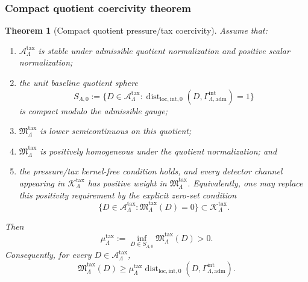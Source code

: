 \documentclass[11pt]{article}
\numberwithin{equation}{section}
\newtheorem{theorem}{Theorem}[section]
\theoremstyle{definition}
\theoremstyle{remark}
\newcommand{\loc}{\mathrm{loc}}
\newcommand{\intg}{\mathrm{int}}
\newcommand{\adm}{\mathrm{adm}}
\newcommand{\Dist}{\operatorname{dist}}
\newcommand{\Gammaadm}{\Gamma^{\intg}_{\Lambda,\adm}}
\begin{document}
\subsubsection{Compact quotient coercivity theorem}

\begin{theorem}[Compact quotient pressure/tax coercivity]
\label{thm:compact-quotient-pressure-tax-coercivity}
Assume that:
\begin{enumerate}[label=(\roman*),leftmargin=*]
    \item \(\mathcal A^{\mathrm{tax}}_\Lambda\) is stable under admissible
    quotient normalization and positive scalar normalization;
    \item the unit baseline quotient sphere
    \[
        S_{\Lambda,0}
        :=
        \{D\in\mathcal A^{\mathrm{tax}}_\Lambda:
        \Dist_{\loc,\intg,0}(D,\Gammaadm)=1\}
    \]
    is compact modulo the admissible gauge;
    \item \(\mathfrak M^{\mathrm{tax}}_\Lambda\) is lower semicontinuous on
    this quotient;
    \item \(\mathfrak M^{\mathrm{tax}}_\Lambda\) is positively homogeneous
    under the quotient normalization; and
    \item the pressure/tax kernel-free condition holds, and every detector
    channel appearing in \(\mathcal K^{\mathrm{tax}}_\Lambda\) has positive
    weight in \(\mathfrak M^{\mathrm{tax}}_\Lambda\).  Equivalently, one may
    replace this positivity requirement by the explicit zero-set condition
    \[
        \{D\in\mathcal A^{\mathrm{tax}}_\Lambda:
        \mathfrak M^{\mathrm{tax}}_\Lambda(D)=0\}
        \subset
        \mathcal K^{\mathrm{tax}}_\Lambda .
    \]
\end{enumerate}
Then
\[
    \mu^{\mathrm{tax}}_\Lambda
    :=
    \inf_{D\in S_{\Lambda,0}}
    \mathfrak M^{\mathrm{tax}}_\Lambda(D)
    >
    0.
\]
Consequently, for every \(D\in\mathcal A^{\mathrm{tax}}_\Lambda\),
\[
    \mathfrak M^{\mathrm{tax}}_\Lambda(D)
    \ge
    \mu^{\mathrm{tax}}_\Lambda
    \Dist_{\loc,\intg,0}(D,\Gammaadm).
\]
\end{theorem}
\end{document}
